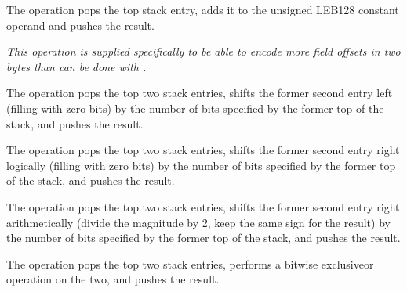 \begin{enumerate}[1. ]
The  operation pops the top stack entry,
adds it to the unsigned LEB128 constant operand and pushes
the result.

\textit{This operation is supplied specifically to be
able to encode more field offsets in two bytes than can be
done with
.}

The  operation pops the top two stack entries,
shifts the former second entry left (filling with zero bits)
by the number of bits specified by the former top of the stack,
and pushes the result.

The  operation pops the top two stack entries,
shifts the former second entry right logically (filling with
zero bits) by the number of bits specified by the former top
of the stack, and pushes the result.

The  operation pops the top two stack entries,
shifts the former second entry right arithmetically (divide
the magnitude by 2, keep the same sign for the result) by
the number of bits specified by the former top of the stack,
and pushes the result.

The  operation pops the top two stack entries,
performs a bitwise exclusive\dash or operation on the two, and
pushes the result.

\end{enumerate}

